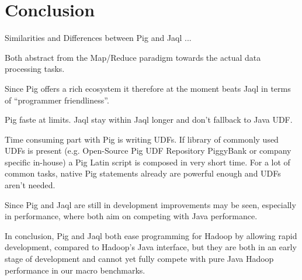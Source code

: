 \section{Conclusion}                      
                                                                                                          
Similarities and Differences between Pig and Jaql ... 

Both abstract from the Map/Reduce paradigm towards the actual data processing tasks.

Since Pig offers a rich ecosystem it therefore at the moment beats Jaql in terms of  ``programmer friendliness''. 

Pig faste at limits. Jaql stay within Jaql longer and don't fallback to Java UDF.

Time consuming part with Pig is writing UDFs. If library of commonly used UDFs is present (e.g. Open-Source Pig UDF Repository PiggyBank or company specific in-house) a Pig Latin script is composed in very short time. For a lot of common tasks, native Pig statements already are powerful enough and UDFs aren't needed.      

Since Pig and Jaql are still in development improvements may be seen, especially in performance, where both aim on competing with Java performance.

In conclusion, Pig and Jaql both ease programming for Hadoop by allowing rapid development, compared to Hadoop's
Java interface, but they are both in an early stage of development and cannot yet fully compete with
pure Java Hadoop performance in our macro benchmarks.